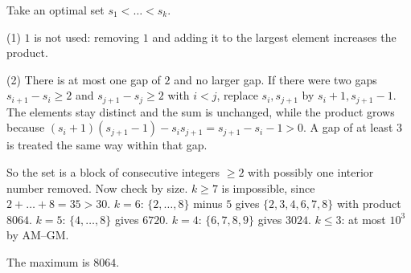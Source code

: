 Take an optimal set $s_1<\dots<s_k$.

(1) $1$ is not used: removing $1$ and adding it to the largest element increases the product.

(2) There is at most one gap of $2$ and no larger gap. If there were two gaps $s_{i+1}-s_i\ge2$ and $s_{j+1}-s_j\ge2$ with $i<j$, replace $s_i,s_{j+1}$ by $s_i+1,s_{j+1}-1$. The elements stay distinct and the sum is unchanged, while the product grows because $(s_i+1)(s_{j+1}-1)-s_is_{j+1}=s_{j+1}-s_i-1>0$. A gap of at least $3$ is treated the same way within that gap.

So the set is a block of consecutive integers $\ge2$ with possibly one interior number removed. Now check by size. $k\ge7$ is impossible, since $2+\dots+8=35>30$. $k=6$: $\{2,\dots,8\}$ minus $5$ gives $\{2,3,4,6,7,8\}$ with product $8064$. $k=5$: $\{4,\dots,8\}$ gives $6720$. $k=4$: $\{6,7,8,9\}$ gives $3024$. $k\le3$: at most $10^3$ by AM--GM.

The maximum is $\boxed{8064}$.
